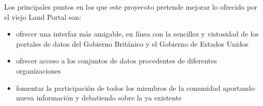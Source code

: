 Los principales puntos en los que este proyecoto pretende mejorar lo ofrecido por el viejo Land Portal son:
\begin{itemize}
\item ofrecer una interfaz más amigable, en línea con la sencillez y vistosidad de los portales de datos del Gobierno Británico y el Gobierno de Estados Unidos
\item ofrecer acceso a los conjuntos de datos procedentes de diferentes organizaciones
\item fomentar la participación de todos los miembros de la comunidad aportando nueva información y debatiendo sobre la ya existente
\end{itemize}

